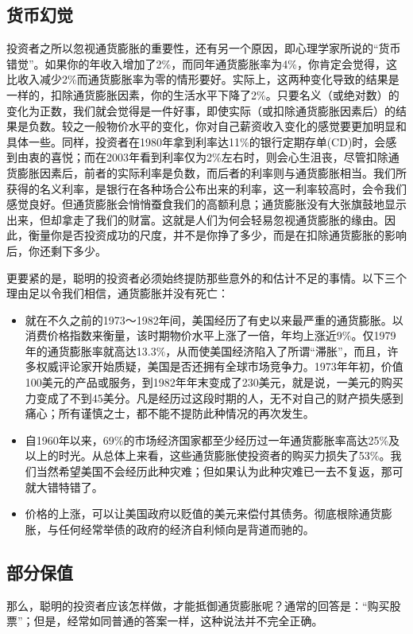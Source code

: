 \documentclass[12pt,oneside]{book}
\begin{document}
\subsection{货币幻觉}
投资者之所以忽视通货膨胀的重要性，还有另一个原因，即心理学家所说的“货币错觉”。如果你的年收入增加了2\%，而同年通货膨胀率为4\%，你肯定会觉得，这比收入减少2\%而通货膨胀率为零的情形要好。实际上，这两种变化导致的结果是一样的，扣除通货膨胀因素，你的生活水平下降了2\%。只要名义（或绝对数）的变化为正数，我们就会觉得是一件好事，即使实际（或扣除通货膨胀因素后）的结果是负数。较之一般物价水平的变化，你对自己薪资收入变化的感觉要更加明显和具体一些。同样，投资者在1980年拿到利率达11\%的银行定期存单(CD)时，会感到由衷的喜悦；而在2003年看到利率仅为2\%左右时，则会心生沮丧，尽管扣除通货膨胀因素后，前者的实际利率是负数，而后者的利率则与通货膨胀相当。我们所获得的名义利率，是银行在各种场合公布出来的利率，这一利率较高时，会令我们感觉良好。但通货膨胀会悄悄蚕食我们的高额利息；通货膨胀没有大张旗鼓地显示出来，但却拿走了我们的财富。这就是人们为何会轻易忽视通货膨胀的缘由。因此，衡量你是否投资成功的尺度，并不是你挣了多少，而是在扣除通货膨胀的影响后，你还剩下多少。

更要紧的是，聪明的投资者必须始终提防那些意外的和估计不足的事情。以下三个理由足以令我们相信，通货膨胀并没有死亡：

\begin{itemize}
\item 就在不久之前的1973～1982年间，美国经历了有史以来最严重的通货膨胀。以消费价格指数来衡量，该时期物价水平上涨了一倍，年均上涨近9\%。仅1979年的通货膨胀率就高达13.3\%，从而使美国经济陷入了所谓“滞胀”，而且，许多权威评论家开始质疑，美国是否还拥有全球市场竞争力。1973年年初，价值100美元的产品或服务，到1982年年末变成了230美元，就是说，一美元的购买力变成了不到45美分。凡是经历过这段时期的人，无不对自己的财产损失感到痛心；所有谨慎之士，都不能不提防此种情况的再次发生。
\item 自1960年以来，69\%的市场经济国家都至少经历过一年通货膨胀率高达25\%及以上的时光。从总体上来看，这些通货膨胀使投资者的购买力损失了53\%。我们当然希望美国不会经历此种灾难；但如果认为此种灾难已一去不复返，那可就大错特错了。
\item 价格的上涨，可以让美国政府以贬值的美元来偿付其债务。彻底根除通货膨胀，与任何经常举债的政府的经济自利倾向是背道而驰的。
\end{itemize}


\subsection{部分保值}
那么，聪明的投资者应该怎样做，才能抵御通货膨胀呢？通常的回答是：“购买股票”；但是，经常如同普通的答案一样，这种说法并不完全正确。
\end{document}
